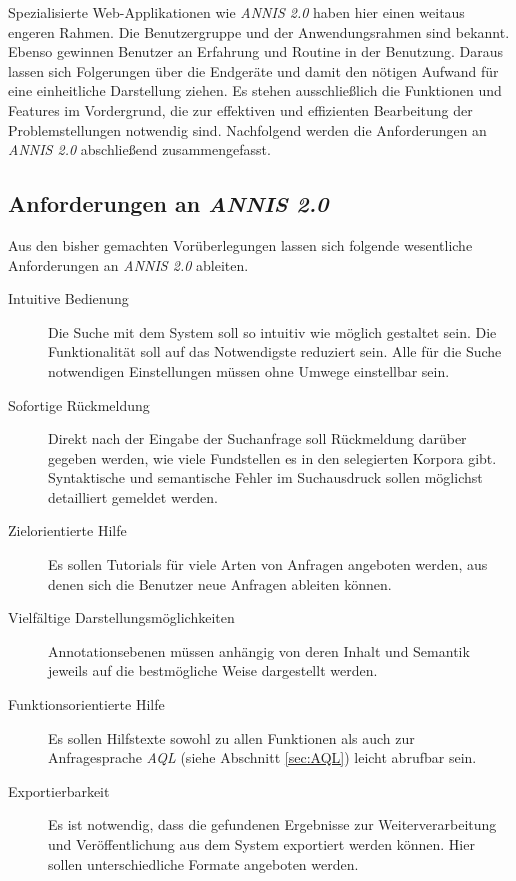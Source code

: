 Spezialisierte Web-Applikationen wie \emph{ANNIS 2.0} haben hier einen weitaus engeren Rahmen. Die Benutzergruppe und der Anwendungsrahmen sind bekannt. Ebenso gewinnen Benutzer an Erfahrung und Routine in der Benutzung. Daraus lassen sich Folgerungen über die Endgeräte und damit den nötigen Aufwand für eine einheitliche Darstellung ziehen. Es stehen ausschließlich die Funktionen und Features im Vordergrund, die zur effektiven und effizienten Bearbeitung der Problemstellungen notwendig sind. Nachfolgend werden die Anforderungen an \emph{ANNIS 2.0} abschließend zusammengefasst.

\subsection{Anforderungen an \emph{ANNIS 2.0}}\label{sec:Anforderungen an ANNIS 2.0}

Aus den bisher gemachten Vorüberlegungen  lassen sich folgende wesentliche Anforderungen an \emph{ANNIS 2.0} ableiten. 

\begin{description}
	\item[Intuitive Bedienung]{Die Suche mit dem System soll so intuitiv wie möglich gestaltet sein. Die Funktionalität soll auf das Notwendigste reduziert sein. Alle für die Suche notwendigen Einstellungen müssen ohne Umwege einstellbar sein.}
	\item[Sofortige Rückmeldung]{Direkt nach der Eingabe der Suchanfrage soll Rückmeldung darüber gegeben werden, wie viele Fundstellen es in den selegierten Korpora gibt. Syntaktische und semantische Fehler im Suchausdruck sollen möglichst detailliert gemeldet werden.}	\item[Zielorientierte Hilfe]{Es sollen Tutorials für viele Arten von Anfragen angeboten werden, aus denen sich die Benutzer neue Anfragen ableiten können.}
	\item[Vielfältige Darstellungsmöglichkeiten]{Annotationsebenen müssen anhängig von deren Inhalt und Semantik jeweils auf die bestmögliche Weise dargestellt werden.}
	\item[Funktionsorientierte Hilfe]{Es sollen Hilfstexte sowohl zu allen Funktionen als auch zur Anfragesprache \emph{AQL} (siehe Abschnitt \ref{sec:AQL}) leicht abrufbar sein.}
	\item[Exportierbarkeit]{Es ist notwendig, dass die gefundenen Ergebnisse zur Weiterverarbeitung und Veröffentlichung aus dem System exportiert werden können. Hier sollen unterschiedliche Formate angeboten werden.}
\end{description}

